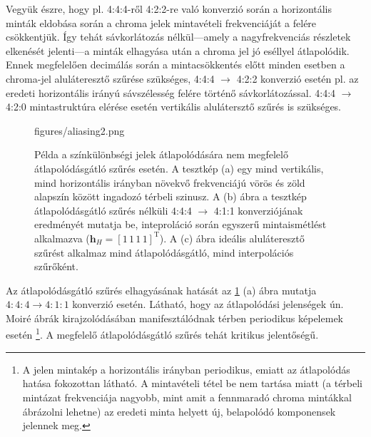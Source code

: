 \vspace{3mm}
Vegyük észre, hogy pl. 4:4:4-ről 4:2:2-re való konverzió során a horizontális minták eldobása során a chroma jelek mintavételi frekvenciáját a felére csökkentjük.
Így tehát sávkorlátozás nélkül---amely a nagyfrekvenciás részletek elkenését jelenti---a minták elhagyása után a chroma jel jó eséllyel átlapolódik.
Ennek megfelelően decimálás során a mintacsökkentés előtt minden esetben a chroma-jel aluláteresztő szűrése szükséges, 4:4:4 $\rightarrow$ 4:2:2 konverzió esetén pl. az eredeti horizontális irányú sávszélesség felére történő sávkorlátozással.
4:4:4 $\rightarrow$ 4:2:0 mintastruktúra elérése esetén vertikális alulátersztő szűrés is szükséges.

\begin{figure}[]
	\centering
	\begin{overpic}[width = 0.9\columnwidth ]{figures/aliasing2.png}
 	\end{overpic}
	\caption{Példa a színkülönbségi jelek átlapolódására nem megfelelő átlapolódásgátló szűrés esetén.
 	A tesztkép (a) egy mind vertikális, mind horizontális irányban növekvő frekvenciájú vörös és zöld alapszín között ingadozó térbeli szinusz.
 	A (b) ábra a tesztkép átlapolódásgátló szűrés nélküli 4:4:4 $\rightarrow$ 4:1:1 konverziójának eredményét mutatja be, inteproláció során egyszerű mintaismétlést alkalmazva ($\mathbf{h}_H= \left[ 1\,1 \,1 \,1 \right]^{\mathrm{T}}$).
	A (c) ábra ideális aluláteresztő szűrést alkalmaz mind átlapolódásgátló, mind interpolációs szűrőként.}
	\label{Fig:chroma_subsampling}
\end{figure}
\vspace{3mm}
Az átlapolódásgátló szűrés elhagyásának hatását az \ref{Fig:chroma_subsampling} (a) ábra mutatja $4:4:4 \rightarrow 4:1:1$ konverzió esetén.
Látható, hogy az átlapolódási jelenségek ún. Moiré ábrák kirajzolódásában manifesztálódnak térben periodikus képelemek esetén \footnote{A jelen mintakép a horizontális irányban periodikus, emiatt az átlapolódás hatása fokozottan látható.
A mintavételi tétel be nem tartása miatt (a térbeli mintázat frekvenciája nagyobb, mint amit a fennmaradó chroma mintákkal ábrázolni lehetne) az eredeti minta helyett új, belapolódó komponensek jelennek meg.}.
A megfelelő átlapolódásgátló szűrés tehát kritikus jelentőségű.

